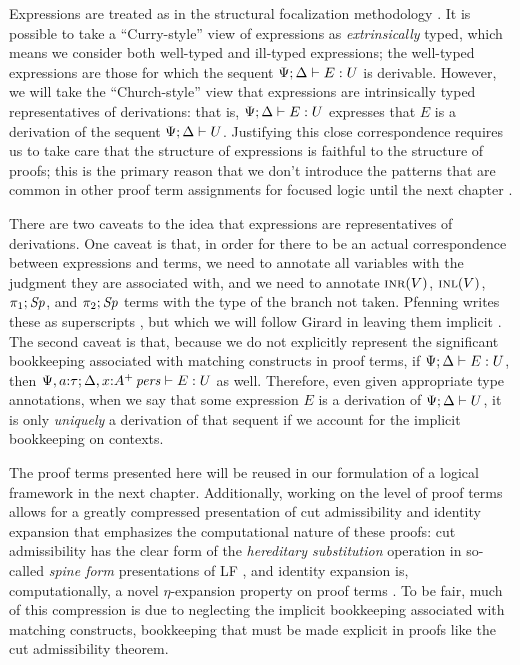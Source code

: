 Expressions are treated as in the structural focalization methodology
\cite{simmons11structural}. It is possible to take a ``Curry-style''
view of expressions as {\it extrinsically} typed, which means we
consider both well-typed and ill-typed expressions; the well-typed
expressions are those for which the sequent
${\Psi}; {\Delta} \vdash {E} : {U}$ is derivable. However, we will take the
``Church-style'' view that expressions are intrinsically typed
representatives of derivations: that is, ${\Psi}; {\Delta} \vdash {E} : {U}$
expresses that $E$ is a derivation of the sequent
${\Psi};{\Delta} \vdash {U}$. Justifying this close correspondence requires
us to take care that the structure of expressions is faithful to the
structure of proofs; this is the primary reason that we don't
introduce the patterns that are common in other proof term assignments
for focused logic until the next chapter
\cite{watkins02concurrent,licata08focusing,krishnaswami09focusing}.

There are two caveats to the idea that expressions are representatives
of derivations. One caveat is that, in order for there to be an actual
correspondence between expressions and terms, we need to annotate all
variables with the judgment they are associated with, and we need to
annotate $\textsc{inr}({V})$, $\textsc{inl}({V})$, $\pi_1;{{\it Sp}}$, and $\pi_2;{{\it Sp}}$
terms with the type of the branch not taken. Pfenning writes these as
superscripts \cite{pfenning08church}, but which we will follow Girard
in leaving them implicit \cite{girard89proofs}. The second caveat is
that, because we do not explicitly represent the significant
bookkeeping associated with matching constructs in proof terms, if
${\Psi}; {\Delta} \vdash {E} : {U}$, then ${\Psi, a{:}\tau}; {\Delta,
  x{:}{A^+}\,{{\it pers}}} \vdash {E} : {U}$ as well. Therefore, even given appropriate
type annotations, when we say that some expression $E$ is a derivation
of ${\Psi};{\Delta} \vdash {U}$, it is only {\it uniquely} a derivation of
that sequent if we account for the implicit bookkeeping on contexts.

The proof terms presented here will be reused in our formulation of a
logical framework in the next chapter.  Additionally, working on the
level of proof terms allows for a greatly compressed presentation of
cut admissibility and identity expansion that emphasizes the
computational nature of these proofs: cut admissibility has the clear
form of the {\it hereditary substitution} operation in so-called {\it
  spine form} presentations of LF \cite{cervesato02linear}, and
identity expansion is, computationally, a novel $\eta$-expansion
property on proof terms \cite{simmons11structural}.  To be fair, much
of this compression is due to neglecting the implicit bookkeeping
associated with matching constructs, bookkeeping that must be made
explicit in proofs like the cut admissibility theorem.

